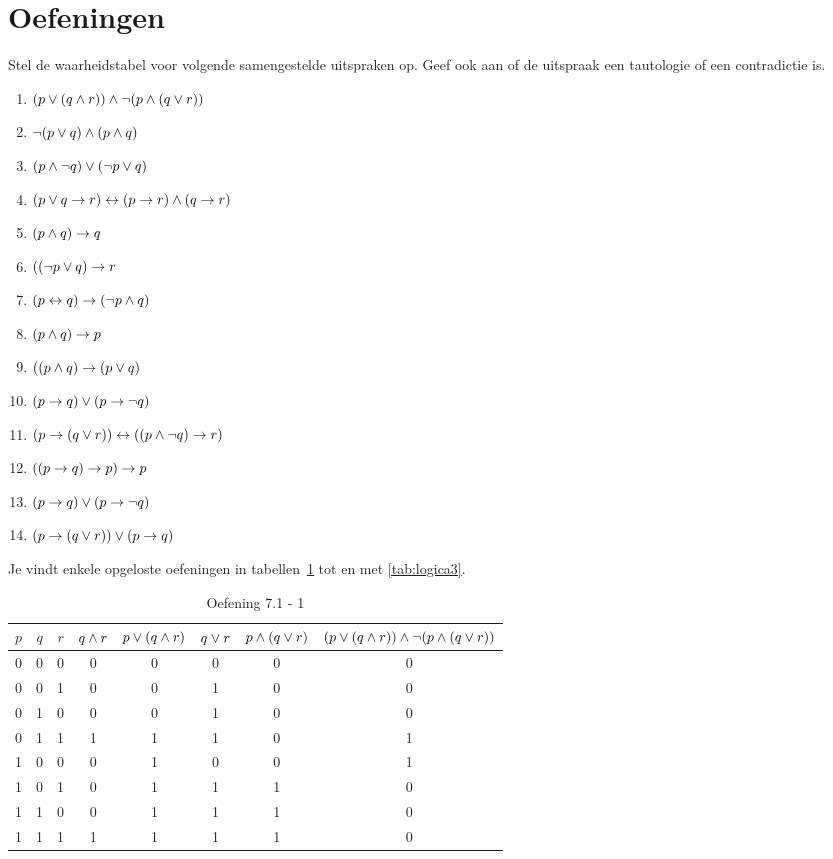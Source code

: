 \section{Oefeningen}
\begin{oef}
 Stel de waarheidstabel voor volgende samengestelde uitspraken op. Geef ook aan of de uitspraak een tautologie of een contradictie is.
\begin{enumerate}
\item $(p \vee (q \wedge r)) \wedge \neg(p \wedge (q \vee r))$
\item $\neg(p \vee q) \wedge (p \wedge q)$
\item $(p \wedge \neg q) \vee (\neg p \vee q)$
\item $(p \vee q \rightarrow r) \leftrightarrow (p\rightarrow r) \wedge (q\rightarrow r)$
\item $(p\wedge q)\rightarrow q$
\item $((\neg p \vee q)\rightarrow r$
\item $(p\leftrightarrow q)\rightarrow (\neg p \wedge q)$
\item $ (p\wedge q)\rightarrow p $
\item $((p\wedge q)\rightarrow (p \vee q)$
\item $  (p \rightarrow q) \vee(p\rightarrow \neg q) $
\item $ (p\rightarrow(q\vee r))\leftrightarrow((p\wedge \neg q)\rightarrow r)  $
\item $  ((p\rightarrow q)\rightarrow p)\rightarrow p $
\item $  (p \rightarrow q)\vee (p \rightarrow \neg q) $
\item $  (p\rightarrow(q\vee r))\vee(p\rightarrow q) $
\end{enumerate}
\begin{opl}
Je vindt enkele opgeloste oefeningen in tabellen~\ref{tab:logica1} tot en met \ref{tab:logica3}.
\begin{table}[htbp]\footnotesize
\centering
\caption{Oefening 7.1 - 1}
\begin{tabular}{cccccccc}
\toprule 
$p$ & $q$ & $r$ & $q\wedge r$ & $p\vee (q\wedge r)$ & $q\vee r$ & $p\wedge (q\vee r)$ & $(p\vee (q\wedge r))\wedge \neg(p\wedge (q\vee r))$ \\ 
\midrule
0 & 0 & 0 & 0 & 0 & 0 & 0 & 0 \\ 
0 & 0 & 1 & 0 & 0 & 1 & 0 & 0 \\ 
0 & 1 & 0 & 0 & 0 & 1 & 0 & 0 \\ 
0 & 1 & 1 & 1 & 1 & 1 & 0 & 1 \\  
1 & 0 & 0 & 0 & 1 & 0 & 0 & 1 \\ 
1 & 0 & 1 & 0 & 1 & 1 & 1 & 0 \\  
1 & 1 & 0 & 0 & 1 & 1 & 1 & 0 \\ 
1 & 1 & 1 & 1 & 1 & 1 & 1 & 0 \\ 
\bottomrule 
\end{tabular} 
\label{tab:logica1}
\end{table}


\end{opl}
\end{oef}
